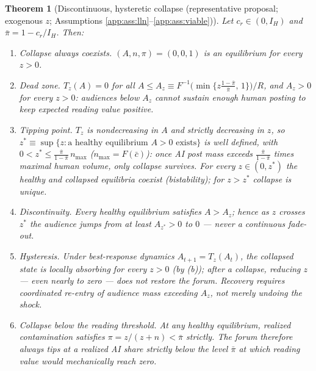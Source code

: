 \documentclass[12pt]{article}
\newtheorem{theorem}{Theorem}
\begin{document}
\begin{theorem}[Discontinuous, hysteretic collapse (representative proposal; exogenous $z$; Assumptions \ref{app:ass:lln}--\ref{app:ass:viable})]
\label{app:thm:tipping}
Let $c_r\in(0,I_H)$ and $\bar\pi=1-c_r/I_H$. Then:
\begin{enumerate}[label=(\alph*),itemsep=1pt]
\item \emph{Collapse always coexists.} $(A,n,\pi)=(0,0,1)$ is an equilibrium for
every $z>0$.
\item \emph{Dead zone.} $T_z(A)=0$ for all $A\le A_z\equiv F^{-1}\bigl(\min\{z\tfrac{1-\bar\pi}{\bar\pi},\,1\}\bigr)/R$,
and $A_z>0$ for every $z>0$: audiences below $A_z$ cannot sustain enough human
posting to keep expected reading value positive.
\item \emph{Tipping point.} $T_z$ is nondecreasing in $A$ and strictly
decreasing in $z$, so
$z^*\equiv\sup\{z:\text{a healthy equilibrium }A>0\text{ exists}\}$
is well defined, with $0<z^*\le\frac{\bar\pi}{1-\bar\pi}\,n_{\max}$
($n_{\max}=F(\bar c)$): once AI post mass exceeds $\frac{\bar\pi}{1-\bar\pi}$
times maximal human volume, only collapse survives. For every $z\in(0,z^*)$ the
healthy and collapsed equilibria \emph{coexist} (bistability); for $z>z^*$
collapse is unique.
\item \emph{Discontinuity.} Every healthy equilibrium satisfies $A>A_z$; hence
as $z$ crosses $z^*$ the audience jumps from at least $A_{z^*}>0$ to $0$ ---
never a continuous fade-out.
\item \emph{Hysteresis.} Under best-response dynamics $A_{t+1}=T_z(A_t)$, the
collapsed state is locally absorbing for every $z>0$ (by (b)); after a collapse,
reducing $z$ --- even nearly to zero --- does not restore the forum. Recovery
requires coordinated re-entry of audience mass exceeding $A_z$, not merely
undoing the shock.
\item \emph{Collapse below the reading threshold.} At any healthy equilibrium,
realized contamination satisfies $\pi=z/(z+n)<\bar\pi$ strictly. The forum
therefore always tips at a realized AI share strictly below the level
$\bar\pi$ at which reading value would mechanically reach zero.
\end{enumerate}
\end{theorem}
\end{document}
